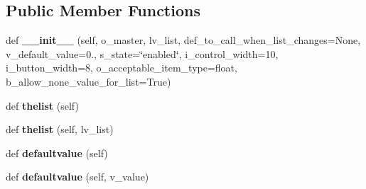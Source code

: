 \subsection*{Public Member Functions}
\begin{DoxyCompactItemize}
\item 
def {\bfseries \+\_\+\+\_\+init\+\_\+\+\_\+} (self, o\+\_\+master, lv\+\_\+list, def\+\_\+to\+\_\+call\+\_\+when\+\_\+list\+\_\+changes=None, v\+\_\+default\+\_\+value=0., s\+\_\+state=\char`\"{}enabled\char`\"{}, i\+\_\+control\+\_\+width=10, i\+\_\+button\+\_\+width=8, o\+\_\+acceptable\+\_\+item\+\_\+type=float, b\+\_\+allow\+\_\+none\+\_\+value\+\_\+for\+\_\+list=True)\hypertarget{classnegui_1_1pglisteditingsubframe_1_1ListEditingSubframe_a056dc8bac2539fcbd7f002e82adea393}{}\label{classnegui_1_1pglisteditingsubframe_1_1ListEditingSubframe_a056dc8bac2539fcbd7f002e82adea393}

\item 
def {\bfseries thelist} (self)\hypertarget{classnegui_1_1pglisteditingsubframe_1_1ListEditingSubframe_a752edbc23d998e0c07a787c2b13acbfa}{}\label{classnegui_1_1pglisteditingsubframe_1_1ListEditingSubframe_a752edbc23d998e0c07a787c2b13acbfa}

\item 
def {\bfseries thelist} (self, lv\+\_\+list)\hypertarget{classnegui_1_1pglisteditingsubframe_1_1ListEditingSubframe_a7ee2540c89f5c8c6d15f5ba8132cf2ce}{}\label{classnegui_1_1pglisteditingsubframe_1_1ListEditingSubframe_a7ee2540c89f5c8c6d15f5ba8132cf2ce}

\item 
def {\bfseries defaultvalue} (self)\hypertarget{classnegui_1_1pglisteditingsubframe_1_1ListEditingSubframe_aa385a1aa0cb6ffdbf3ab1d743fa5bf3a}{}\label{classnegui_1_1pglisteditingsubframe_1_1ListEditingSubframe_aa385a1aa0cb6ffdbf3ab1d743fa5bf3a}

\item 
def {\bfseries defaultvalue} (self, v\+\_\+value)\hypertarget{classnegui_1_1pglisteditingsubframe_1_1ListEditingSubframe_a3670d218aa119b54a3e29d7e6b0792e2}{}\label{classnegui_1_1pglisteditingsubframe_1_1ListEditingSubframe_a3670d218aa119b54a3e29d7e6b0792e2}

\end{DoxyCompactItemize}
